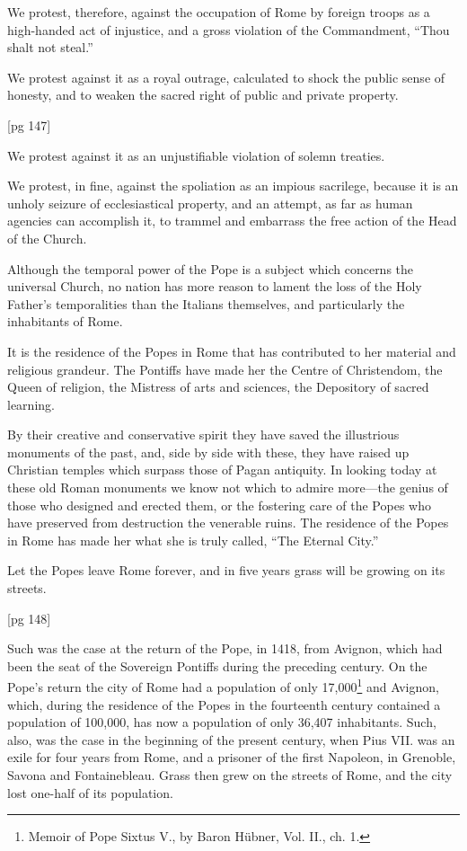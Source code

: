 We protest, therefore, against the occupation of
Rome by foreign troops as a high-handed act of
injustice, and a gross violation of the Commandment,
“Thou shalt not steal.”

We protest against it as a royal outrage, calculated
to shock the public sense of honesty, and to
weaken the sacred right of public and private
property.

[pg 147]

We protest against it as an unjustifiable violation
of solemn treaties.

We protest, in fine, against the spoliation as an
impious sacrilege, because it is an unholy seizure
of ecclesiastical property, and an attempt, as far
as human agencies can accomplish it, to trammel
and embarrass the free action of the Head of the
Church.


Although the temporal power of the Pope is a
subject which concerns the universal Church, no
nation has more reason to lament the loss of the
Holy Father's temporalities than the Italians
themselves, and particularly the inhabitants of
Rome.

It is the residence of the Popes in Rome that
has contributed to her material and religious
grandeur. The Pontiffs have made her the Centre
of Christendom, the Queen of religion, the Mistress
of arts and sciences, the Depository of sacred
learning.

By their creative and conservative spirit they
have saved the illustrious monuments of the past,
and, side by side with these, they have raised up
Christian temples which surpass those of Pagan
antiquity. In looking today at these old Roman
monuments we know not which to admire more—the
genius of those who designed and erected them,
or the fostering care of the Popes who have preserved
from destruction the venerable ruins. The
residence of the Popes in Rome has made her
what she is truly called, “The Eternal City.”

Let the Popes leave Rome forever, and in five
years grass will be growing on its streets.

[pg 148]

Such was the case at the return of the Pope, in
1418, from Avignon, which had been the seat of
the Sovereign Pontiffs during the preceding century.
On the Pope's return the city of Rome had
a population of only 17,000\footnote{Memoir of Pope
Sixtus V., by Baron Hübner, Vol. II., ch. 1.} and Avignon, which,
during the residence of the Popes in the fourteenth
century contained a population of 100,000,
has now a population of only 36,407 inhabitants.
Such, also, was the case in the beginning of the
present century, when Pius VII. was an exile for
four years from Rome, and a prisoner of the first
Napoleon, in Grenoble, Savona and Fontainebleau.
Grass then grew on the streets of Rome, and the
city lost one-half of its population.

